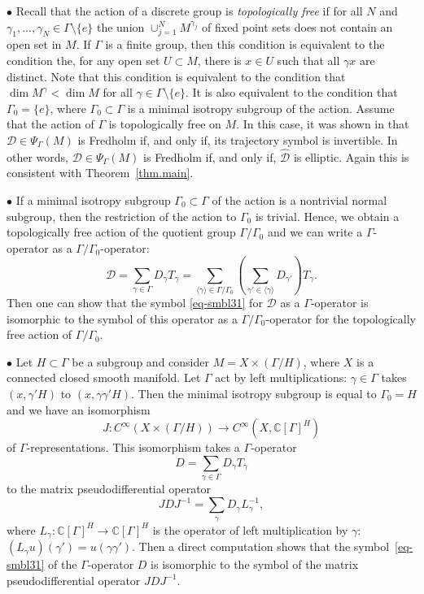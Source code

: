 \documentclass[11pt,a4paper]{amsart}
\newcommand{\maD}{\mathcal D}
\newcommand\<{\langle}
\renewcommand\>{\rangle}
\theoremstyle{definition}
\begin{document}
$\bullet$ Recall that the action of a discrete  group is {\em topologically free}
if for all $N$ and $\gamma_1,...,\gamma_N\in \Gamma\setminus\{e\}$ the union   $\cup_{j=1}^N M^{\gamma_j}$ of fixed point sets does not contain an open set in $M$. If  $\Gamma$ is a finite group, then this condition is equivalent to the condition the, for any open set $U \subset M$, there is $x \in U$ such that all $\gamma x$ are distinct. Note that this condition is equivalent to the condition that $\dim M^\gamma<\dim M$ for all $\gamma\in\Gamma\setminus\{e\}$. It is also equivalent to the condition that $\Gamma_0=\{e\}$, where   $\Gamma_0\subset\Gamma$ is a minimal isotropy subgroup of the action. 
Assume that the action of $\Gamma$ is topologically free on $M$.
In this case, it was shown in \cite{AL94,%
ABL98b}
that $\maD \in \Psi_\Gamma(M)$ is Fredholm if, and only if, its trajectory symbol is invertible.
In other words, $\maD \in \Psi_\Gamma(M)$ is Fredholm if, and only if, $\hat{\maD}$ is elliptic.
Again this is consistent with Theorem~\ref{thm.main}.

 
 
 $\bullet$ If a minimal isotropy subgroup $\Gamma_0\subset\Gamma$ of the action is a nontrivial normal subgroup, then the restriction of the action to $\Gamma_0$ is trivial. Hence, we obtain a topologically free action of the quotient group $\Gamma/\Gamma_0$ and we can write a $\Gamma$-operator as a $\Gamma/\Gamma_0$-operator:
 $$
 \mathcal{D}=\sum_{\gamma\in\Gamma} D_\gamma T_\gamma=\sum_{\langle\gamma\rangle\in \Gamma/\Gamma_0}\left(\sum_{\gamma'\in  \langle\gamma\rangle} D_{\gamma'}\right)T_\gamma.
 $$
 Then one can show that the symbol \eqref{eq-smbl31} for $\mathcal{D}$ as a $\Gamma$-operator is isomorphic to the symbol of this operator as a $\Gamma/\Gamma_0$-operator for the topologically free action of  $\Gamma/\Gamma_0$.
 
  $\bullet$ Let $H\subset \Gamma$ be a subgroup and consider $M=X\times (\Gamma/H)$, where $X$ is a connected closed smooth manifold. Let   $\Gamma$ act by left multiplications: $\gamma\in\Gamma$ takes  $(x,\gamma' H)  $ to $(x, \gamma \gamma' H)$. Then the minimal isotropy subgroup is equal to $\Gamma_0=H$ and we have an isomorphism 
$$
    J:C^\infty(X\times (\Gamma/H))\to C^\infty(X,\mathbb{C}[\Gamma]^H)
$$ 
of $\Gamma$-representations. This isomorphism takes a $\Gamma$-operator 
$$
D=\sum_{\gamma\in \Gamma} D_\gamma T_\gamma
$$
to the matrix pseudodifferential operator
$$
 JDJ^{-1}=\sum_\gamma D_\gamma  L^{-1}_\gamma,
$$
where $L_\gamma: \mathbb{C}[\Gamma]^{H}\to  \mathbb{C}[\Gamma]^{H}$ is the operator of left multiplication by $\gamma$: $(L_\gamma u)(\gamma')=u(\gamma \gamma')$.  Then a direct computation shows that the symbol~\eqref{eq-smbl31} of the $\Gamma$-operator $D$ is isomorphic to the symbol of the matrix pseudodifferential operator $JDJ^{-1}$.
\end{document}
